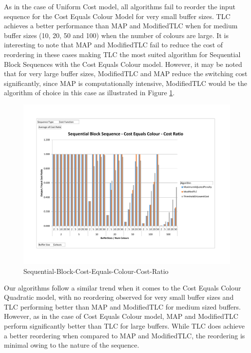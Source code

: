 As in the case of Uniform Cost model, all algorithms fail to reorder the input sequence for the Cost Equals Colour Model for very small buffer sizes. TLC achieves a better performance than MAP and ModifiedTLC when for medium buffer sizes (10, 20, 50 and 100) when the number of colours are large. It is interesting to note that MAP and ModifiedTLC fail to reduce the cost of reordering in these cases making TLC the most suited algorithm for Sequential Block Sequences with the Cost Equals Colour model. However, it may be noted that for very large buffer sizes, ModifiedTLC and MAP reduce the switching cost significantly, since MAP is computationally intensive, ModifiedTLC would be the algorithm of choice in this case as illustrated in Figure \ref{SequentialBlockCostEqualsColour}. 

\begin{figure}[ht]
\centering 
\includegraphics[scale=0.60]{Sequential-Block-Cost-Equals-Colour.pdf}
\caption{Sequential-Block-Cost-Equals-Colour-Cost-Ratio}
\label{SequentialBlockCostEqualsColour}
\end{figure}

Our algorithms follow a similar trend when it comes to the Cost Equals Colour Quadratic model, with no reordering observed for very small buffer sizes and TLC performing better than MAP and ModifiedTLC for medium sized buffers. However, as in the case of Cost Equals Colour model, MAP and ModifiedTLC perform significantly better than TLC for large buffers. While TLC does achieve a better reordering when compared to MAP and ModifiedTLC, the reordering is minimal owing to the nature of the sequence. 

